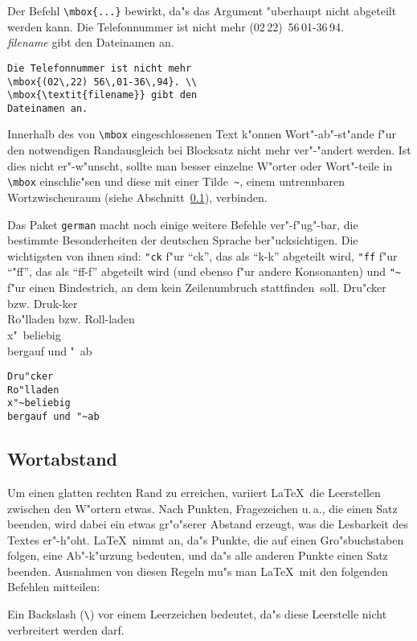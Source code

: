 Der Befehl \verb|\mbox{...}| bewirkt, da"s das Argument "uberhaupt nicht
abgeteilt werden kann.
\exa
Die Telefonnummer ist nicht mehr
\mbox{(02\,22) 56\,01-36\,94}. \\
\mbox{\textit{filename}} gibt den 
Dateinamen an.
\exb 
\begin{verbatim}
Die Telefonnummer ist nicht mehr
\mbox{(02\,22) 56\,01-36\,94}. \\
\mbox{\textit{filename}} gibt den 
Dateinamen an.
\end{verbatim}
\exc
Innerhalb des von \verb|\mbox| eingeschlossenen Text k"onnen
Wort"-ab"-st"ande f"ur den notwendigen Randausgleich bei
Blocksatz nicht mehr ver"-"andert werden.  Ist dies nicht
er"-w"unscht, sollte man besser einzelne W"orter oder Wort"-teile
in \verb|\mbox| einschlie"sen und diese mit einer Tilde~\verb|~|,
einem untrennbaren Wortzwischenraum (siehe
Abschnitt~\ref{abstaende}), verbinden.


Das Paket \texttt{german} macht noch einige weitere Befehle
ver"-f"ug"-bar, die bestimmte Besonderheiten der deutschen Sprache
ber"ucksichtigen.  Die wichtigsten von ihnen sind:
\verb|"ck| f"ur "`ck"', das als "`\mbox{k-k}"' abgeteilt wird,
\verb|"ff| f"ur "`"ff"', das als "`\mbox{ff-f}"' abgeteilt wird
(und ebenso f"ur andere Konsonanten)
und \verb|"~| f"ur einen Bindestrich, an dem kein Zeilenumbruch
stattfinden~soll.
\exa
Dru"cker bzw. Druk-ker \\
Ro"lladen bzw. Roll-laden \\
x"~beliebig\\
bergauf und "~ab
\exb
\begin{verbatim}
Dru"cker
Ro"lladen
x"~beliebig
bergauf und "~ab
\end{verbatim}
\exc


\subsection{Wortabstand} \label{abstaende}
 
Um einen glatten rechten Rand zu erreichen, variiert \LaTeX\ die
Leerstellen zwischen den W"ortern etwas.
Nach Punkten, Fragezeichen u.\,a., die einen Satz beenden, wird
dabei ein etwas gr"o"serer Abstand erzeugt, was die Lesbarkeit
des Textes er"-h"oht.
\LaTeX\ nimmt an, da"s Punkte, die auf einen Gro"sbuchstaben
folgen, eine Ab"-k"urzung bedeuten, und da"s alle anderen Punkte
einen Satz beenden.
Ausnahmen von diesen Regeln mu"s man \LaTeX\ mit den folgenden
Befehlen mitteilen:

Ein Backslash (\verb:\:) vor einem Leerzeichen bedeutet, da"s diese
Leerstelle nicht verbreitert werden darf.

